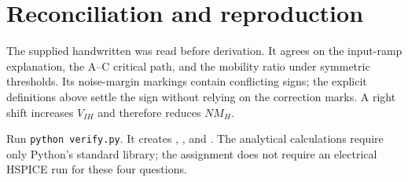 \documentclass[11pt]{article}
\begin{document}
\section*{Reconciliation and reproduction}
The supplied handwritten  was read before derivation. It agrees on the input-ramp explanation, the A--C critical path, and the mobility ratio under symmetric thresholds. Its noise-margin markings contain conflicting signs; the explicit definitions above settle the sign without relying on the correction marks. A right shift increases $V_{IH}$ and therefore reduces $NM_H$.

Run \texttt{python verify.py}. It creates , , and . The analytical calculations require only Python's standard library; the assignment does not require an electrical HSPICE run for these four questions.
\end{document}
